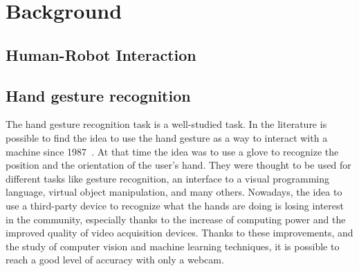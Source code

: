 \documentclass[../thesis.tex]{subfiles}
\begin{document}
\chapter{Background}\label{cap:background}

\section{Human-Robot Interaction}

\section{Hand gesture recognition}
The hand gesture recognition task is a well-studied task. In the literature is possible to find the idea to use the hand gesture as a way to interact with a machine since 1987~\cite{article:hand_gesture_interface_device}. At that time the idea was to use a glove to recognize the position and the orientation of the user's hand. They were thought to be used for different tasks like gesture recognition, an interface to a visual programming language, virtual object manipulation, and many others. Nowadays, the idea to use a third-party device to recognize what the hands are doing is losing interest in the community, especially thanks to the increase of computing power and the improved quality of video acquisition devices. Thanks to these improvements, and the study of computer vision and machine learning techniques, it is possible to reach a good level of accuracy with only a webcam.
\end{document}
